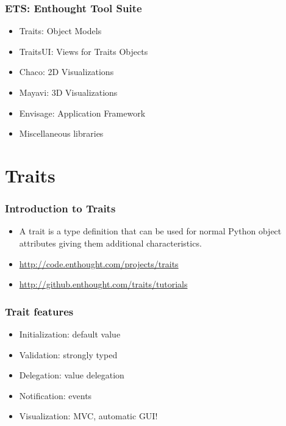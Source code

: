 \documentclass[14pt,compress]{beamer}
\begin{document}
\begin{frame}
  \frametitle{ETS: Enthought Tool Suite}
  \begin{itemize}
    \item Traits: Object Models
    \item TraitsUI: Views for Traits Objects
    \item Chaco: 2D Visualizations
    \item Mayavi: 3D Visualizations
    \item Envisage: Application Framework
    \vspace*{0.5in}
    \item Miscellaneous libraries
  \end{itemize}
\end{frame}



\section{Traits}

\begin{frame}
  \frametitle{Introduction to Traits}
  \begin{itemize}
    \item A \alert{trait} is a type definition that can be used for normal
        Python object attributes giving them additional characteristics.
    \vspace*{2em}

    \item \url{http://code.enthought.com/projects/traits}
    \item \url{http://github.enthought.com/traits/tutorials}

  \end{itemize}
\end{frame}

\begin{frame}
  \frametitle{Trait features}
  \begin{itemize}
    \item Initialization: default value
    \item Validation: strongly typed
    \item Delegation: value delegation
    \item Notification: events
    \item Visualization: MVC, automatic GUI!
  \end{itemize}
\end{frame}
\end{document}
